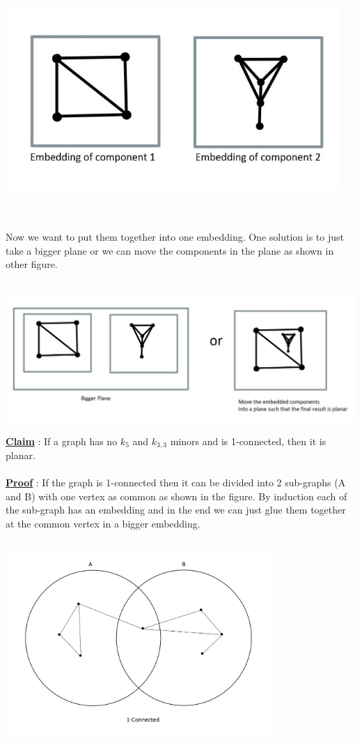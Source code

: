 \documentclass{article}
\begin{document}
    \\\\
    \centerline{\includegraphics[width=5in]{Images/component_embeddings.JPG}}
    \\\\
    Now we want to put them together into one embedding. One solution is to just take a bigger plane or we can move the components in the plane as shown in other figure.
    \\\\
    \centerline{\includegraphics[width=7in]{Images/0_connected_embedding.JPG}}
    \newpage
    \underline{\textbf{Claim}} : If a graph has no $k_{5}$ and $k_{3,3}$ minors and is 1-connected, then it is planar. 
    \\\\
    \underline{\textbf{Proof}} : If the graph is 1-connected then it  can be divided into 2 sub-graphs (A and B) with one vertex as common as shown in the figure. By induction each of the sub-graph has an embedding and in the end we can just glue them together at the common vertex in a bigger embedding.  
    \\\\
    \centerline{\includegraphics[width=4in]{Images/1conngrapg.PNG}}
\end{document}
